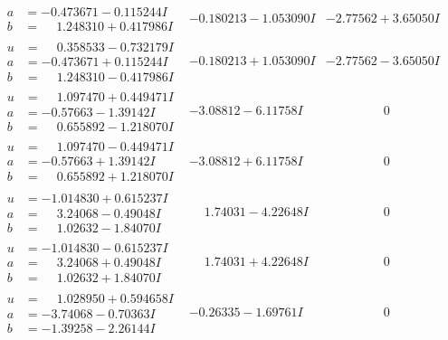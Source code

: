 \documentclass[1p]{elsarticle_modified}
\theoremstyle{definition}
\begin{document}
$$\begin{array}{c|c|c}
\begin{aligned}
a &= -0.473671 - 0.115244 I \\
b &= \phantom{-}1.248310 + 0.417986 I\end{aligned}
 & -0.180213 - 1.053090 I & -2.77562 + 3.65050 I \\ \hline\begin{aligned}
u &= \phantom{-}0.358533 - 0.732179 I \\
a &= -0.473671 + 0.115244 I \\
b &= \phantom{-}1.248310 - 0.417986 I\end{aligned}
 & -0.180213 + 1.053090 I & -2.77562 - 3.65050 I \\ \hline\begin{aligned}
u &= \phantom{-}1.097470 + 0.449471 I \\
a &= -0.57663 - 1.39142 I \\
b &= \phantom{-}0.655892 - 1.218070 I\end{aligned}
 & -3.08812 - 6.11758 I & \phantom{-0.000000 } 0 \\ \hline\begin{aligned}
u &= \phantom{-}1.097470 - 0.449471 I \\
a &= -0.57663 + 1.39142 I \\
b &= \phantom{-}0.655892 + 1.218070 I\end{aligned}
 & -3.08812 + 6.11758 I & \phantom{-0.000000 } 0 \\ \hline\begin{aligned}
u &= -1.014830 + 0.615237 I \\
a &= \phantom{-}3.24068 - 0.49048 I \\
b &= \phantom{-}1.02632 - 1.84070 I\end{aligned}
 & \phantom{-}1.74031 - 4.22648 I & \phantom{-0.000000 } 0 \\ \hline\begin{aligned}
u &= -1.014830 - 0.615237 I \\
a &= \phantom{-}3.24068 + 0.49048 I \\
b &= \phantom{-}1.02632 + 1.84070 I\end{aligned}
 & \phantom{-}1.74031 + 4.22648 I & \phantom{-0.000000 } 0 \\ \hline\begin{aligned}
u &= \phantom{-}1.028950 + 0.594658 I \\
a &= -3.74068 - 0.70363 I \\
b &= -1.39258 - 2.26144 I\end{aligned}
 & -0.26335 - 1.69761 I & \phantom{-0.000000 } 0 \\ \hline\begin{aligned}

\end{aligned}
\end{array}$$
\end{document}
